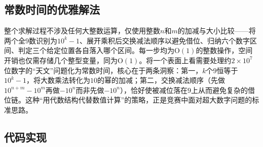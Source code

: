 \subsection{常数时间的优雅解法}

整个求解过程不涉及任何大整数运算，仅使用整数$n$和$m$的加减与大小比较——将两个全$9$数识别为$10^k - 1$、展开乘积后交换减法顺序以避免借位、归纳六个数字区间、判定三个给定位置各自落入哪个区间。每一步均为$\mathrm{O}(1)$的整数操作，空间开销也仅需存储几个整型变量，同为$\mathrm{O}(1)$。将一个表面上看需要处理约$2 \times 10^7$位数字的“天文”问题化为常数时间，核心在于两条洞察：第一，$k$个$9$恒等于$10^k - 1$，将大数乘法转化为$10$的幂的加减；第二，交换减法顺序（先做$10^{n+m}-10^m$再做$-10^n$而非先做$-10^n$），恰好使被减位落在$9$上从而避免复杂的借位链。这种“用代数结构代替数值计算”的策略，正是竞赛中面对超大数字问题的标准思路。

\subsection{代码实现}
\inputminted{c++}{../src/p01_key_extraction.cpp}
